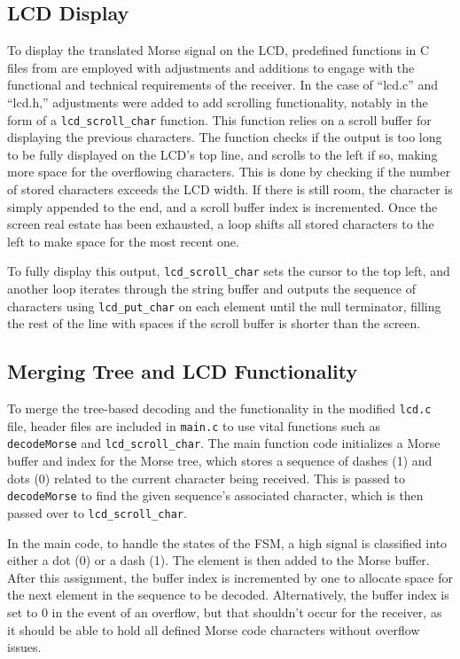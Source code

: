 \documentclass[head=13.6pt]{cce2014-design}
\begin{document}
\subsection{LCD Display}
To display the translated Morse signal on the LCD, predefined functions in C files from \cite{umcode} are employed with adjustments and additions to engage with the functional and technical requirements of the receiver. In the case of ``lcd.c'' and ``lcd.h,'' adjustments were added to add scrolling functionality, notably in the form of a \texttt{lcd\_scroll\_char} function. This function relies on a scroll buffer for displaying the previous characters. The function checks if the output is too long to be fully displayed on the LCD’s top line, and scrolls to the left if so, making more space for the overflowing characters. This is done by checking if the number of stored characters exceeds the LCD width. If there is still room, the character is simply appended to the end, and a scroll buffer index is incremented. Once the screen real estate has been exhausted, a loop shifts all stored characters to the left to make space for the most recent one.

To fully display this output, \texttt{lcd\_scroll\_char} sets the cursor to the top left, and another loop iterates through the string buffer and outputs the sequence of characters using \texttt{lcd\_put\_char} on each element until the null terminator, filling the rest of the line with spaces if the scroll buffer is shorter than the screen.

\subsection{Merging Tree and LCD Functionality}
To merge the tree-based decoding and the functionality in the modified \texttt{lcd.c} file, header files are included in \texttt{main.c} to use vital functions such as \texttt{decodeMorse} and \texttt{lcd\_scroll\_char}. The main function code initializes a Morse buffer and index for the Morse tree, which stores a sequence of dashes (1) and dots (0) related to the current character being received. This is passed to \texttt{decodeMorse} to find the given sequence’s associated character, which is then passed over to \texttt{lcd\_scroll\_char}.

In the main code, to handle the states of the FSM, a high signal is classified into either a dot (0) or a dash (1). The element is then added to the Morse buffer. After this assignment, the buffer index is incremented by one to allocate space for the next element in the sequence to be decoded. Alternatively, the buffer index is set to 0 in the event of an overflow, but that shouldn’t occur for the receiver, as it should be able to hold all defined Morse code characters without overflow issues.
\end{document}

